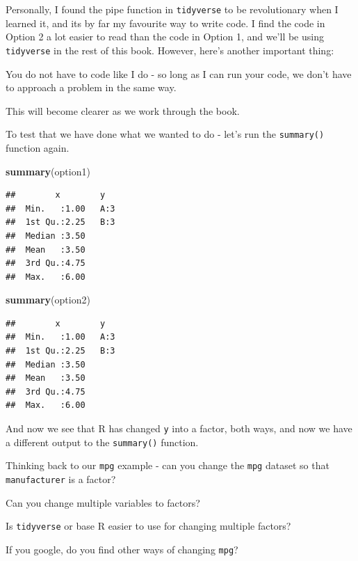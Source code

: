\documentclass[
]{book}
\newenvironment{Shaded}{\begin{snugshade}}{\end{snugshade}}
\newcommand{\KeywordTok}[1]{\textcolor[rgb]{0.13,0.29,0.53}{\textbf{#1}}}
\newcommand{\NormalTok}[1]{#1}
\begin{document}
Personally, I found the pipe function in \texttt{tidyverse} to be revolutionary when I learned it, and its by far my favourite way to write code. I find the code in Option 2 a lot easier to read than the code in Option 1, and we'll be using \texttt{tidyverse} in the rest of this book. However, here's another important thing:

You do not have to code like I do - so long as I can run your code, we don't have to approach a problem in the same way.

This will become clearer as we work through the book.

To test that we have done what we wanted to do - let's run the \texttt{summary()} function again.

\begin{Shaded}
\begin{Highlighting}[]
\KeywordTok{summary}\NormalTok{(option1)}
\end{Highlighting}
\end{Shaded}

\begin{verbatim}
##        x        y    
##  Min.   :1.00   A:3  
##  1st Qu.:2.25   B:3  
##  Median :3.50        
##  Mean   :3.50        
##  3rd Qu.:4.75        
##  Max.   :6.00
\end{verbatim}

\begin{Shaded}
\begin{Highlighting}[]
\KeywordTok{summary}\NormalTok{(option2)}
\end{Highlighting}
\end{Shaded}

\begin{verbatim}
##        x        y    
##  Min.   :1.00   A:3  
##  1st Qu.:2.25   B:3  
##  Median :3.50        
##  Mean   :3.50        
##  3rd Qu.:4.75        
##  Max.   :6.00
\end{verbatim}

And now we see that R has changed \texttt{y} into a factor, both ways, and now we have a different output to the \texttt{summary()} function.

Thinking back to our \texttt{mpg} example - can you change the \texttt{mpg} dataset so that \texttt{manufacturer} is a factor?

Can you change multiple variables to factors?

Is \texttt{tidyverse} or base R easier to use for changing multiple factors?

If you google, do you find other ways of changing \texttt{mpg}?
\end{document}
